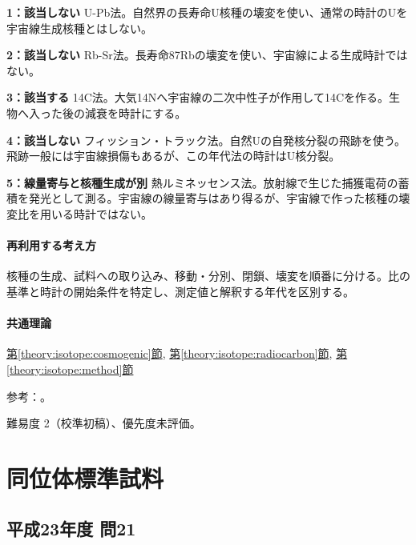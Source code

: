 \noindent\textbf{1：該当しない} U-Pb法。自然界の長寿命U核種の壊変を使い、通常の時計のUを宇宙線生成核種とはしない。\par

\noindent\textbf{2：該当しない} Rb-Sr法。長寿命87Rbの壊変を使い、宇宙線による生成時計ではない。\par

\noindent\textbf{3：該当する} 14C法。大気14Nへ宇宙線の二次中性子が作用して14Cを作る。生物へ入った後の減衰を時計にする。\par

\noindent\textbf{4：該当しない} フィッション・トラック法。自然Uの自発核分裂の飛跡を使う。飛跡一般には宇宙線損傷もあるが、この年代法の時計はU核分裂。\par

\noindent\textbf{5：線量寄与と核種生成が別} 熱ルミネッセンス法。放射線で生じた捕獲電荷の蓄積を発光として測る。宇宙線の線量寄与はあり得るが、宇宙線で作った核種の壊変比を用いる時計ではない。\par

\paragraph{再利用する考え方} 核種の生成、試料への取り込み、移動・分別、閉鎖、壊変を順番に分ける。比の基準と時計の開始条件を特定し、測定値と解釈する年代を区別する。

\paragraph{共通理論} \hyperref[theory:isotope:cosmogenic]{第\ref*{theory:isotope:cosmogenic}節}, \hyperref[theory:isotope:radiocarbon]{第\ref*{theory:isotope:radiocarbon}節}, \hyperref[theory:isotope:method]{第\ref*{theory:isotope:method}節}

\par 参考：\cite{iso_radiometric}。

\par 難易度 2（校準初稿）、優先度未評価。

\section{同位体標準試料}

\subsection{平成23年度 問21}
\label{q:h23-reg-applied-21}

